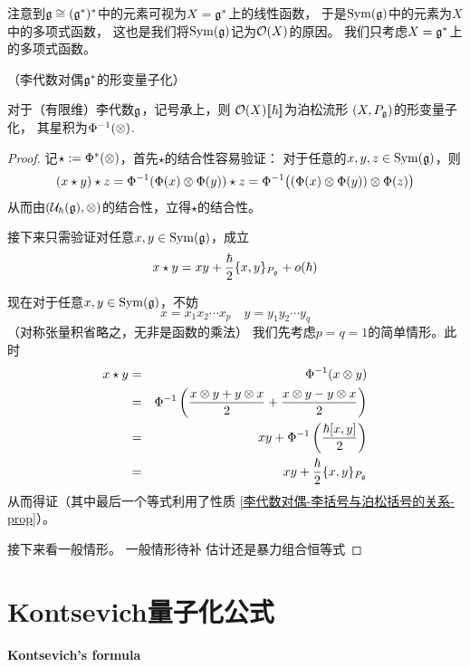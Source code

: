注意到$\mathfrak{g}\cong(\mathfrak{g}^*)^*$中的元素可视为$X=\mathfrak{g}^*$上的线性函数，
于是$\operatorname{Sym}(\mathfrak{g})$中的元素为$X$中的多项式函数，
这也是我们将$\operatorname{Sym}(\mathfrak{g})$记为$\mathcal{O}(X)$的原因。
我们只考虑$X=\mathfrak{g}^*$上的多项式函数。


\begin{Example}（李代数对偶$\mathfrak{g}^*$的形变量子化）

对于（有限维）李代数$\mathfrak{g}$，记号承上，则
$\mathcal{O}(X)[\![\hbar]\!]$为泊松流形
$(X,P_{\mathfrak{g}})$的形变量子化，
其星积为$\Phi^{-1}(\otimes)$.
\end{Example}

\begin{proof}
记$\star:=\Phi^*(\otimes)$，首先$\star$的结合性容易验证：
对于任意的$x,y,z\in\operatorname{Sym}(\mathfrak{g})$，则
\begin{eqnarray*}
(x\star y)\star z=\Phi^{-1}(\Phi(x)\otimes\Phi(y))\star z
=\Phi^{-1}\big((\Phi(x)\otimes\Phi(y))\otimes \Phi(z)\big)
\end{eqnarray*}
从而由$(\mathcal{U}_{\hbar}(\mathfrak{g}),\otimes)$的结合性，立得$\star$的结合性。

接下来只需验证对任意$x,y\in\operatorname{Sym}(\mathfrak{g})$，成立
$$x\star y=xy+\frac{\hbar}{2}\{x,y\}_{P_{\mathfrak{g}}}+o(\hbar)$$

现在对于任意$x,y\in\operatorname{Sym}(\mathfrak{g})$，不妨
$$x=x_1x_2\cdots x_p\quad y=y_1y_2\cdots y_q$$
（对称张量积省略之，无非是函数的乘法）
我们先考虑$p=q=1$的简单情形。此时
\begin{eqnarray*}
     x\star y
&=&
     \Phi^{-1}
     (x\otimes y)\\
&=&
     \Phi^{-1}
     \left(
       \frac{x\otimes y+ y\otimes x}{2}
      +\frac{x\otimes y- y\otimes x}{2}
     \right)\\
&=&
    xy+\Phi^{-1}
    \left(
      \frac{\hbar[x,y]}{2}
    \right)\\
&=&
    xy+\frac{\hbar}{2}\{x,y\}_{P_{\mathfrak{g}}}
\end{eqnarray*}
从而得证（其中最后一个等式利用了性质
\ref{李代数对偶-李括号与泊松括号的关系-prop}）。

接下来看一般情形。
{\color{red}
一般情形待补
\color{blue}
估计还是暴力组合恒等式}
\end{proof}



\section{Kontsevich量子化公式}
\textbf{Kontsevich's formula}

